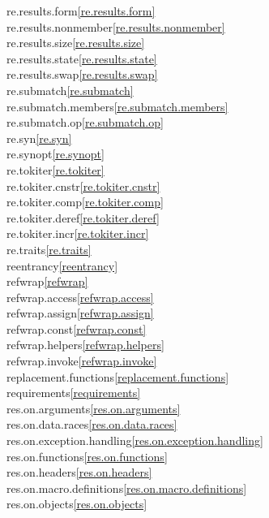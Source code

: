 \begin{multicols}{2}
re.results.form\quad\ref{re.results.form}\\
re.results.nonmember\quad\ref{re.results.nonmember}\\
re.results.size\quad\ref{re.results.size}\\
re.results.state\quad\ref{re.results.state}\\
re.results.swap\quad\ref{re.results.swap}\\
re.submatch\quad\ref{re.submatch}\\
re.submatch.members\quad\ref{re.submatch.members}\\
re.submatch.op\quad\ref{re.submatch.op}\\
re.syn\quad\ref{re.syn}\\
re.synopt\quad\ref{re.synopt}\\
re.tokiter\quad\ref{re.tokiter}\\
re.tokiter.cnstr\quad\ref{re.tokiter.cnstr}\\
re.tokiter.comp\quad\ref{re.tokiter.comp}\\
re.tokiter.deref\quad\ref{re.tokiter.deref}\\
re.tokiter.incr\quad\ref{re.tokiter.incr}\\
re.traits\quad\ref{re.traits}\\
reentrancy\quad\ref{reentrancy}\\
refwrap\quad\ref{refwrap}\\
refwrap.access\quad\ref{refwrap.access}\\
refwrap.assign\quad\ref{refwrap.assign}\\
refwrap.const\quad\ref{refwrap.const}\\
refwrap.helpers\quad\ref{refwrap.helpers}\\
refwrap.invoke\quad\ref{refwrap.invoke}\\
replacement.functions\quad\ref{replacement.functions}\\
requirements\quad\ref{requirements}\\
res.on.arguments\quad\ref{res.on.arguments}\\
res.on.data.races\quad\ref{res.on.data.races}\\
res.on.exception.handling\quad\ref{res.on.exception.handling}\\
res.on.functions\quad\ref{res.on.functions}\\
res.on.headers\quad\ref{res.on.headers}\\
res.on.macro.definitions\quad\ref{res.on.macro.definitions}\\
res.on.objects\quad\ref{res.on.objects}\\

\end{multicols}
